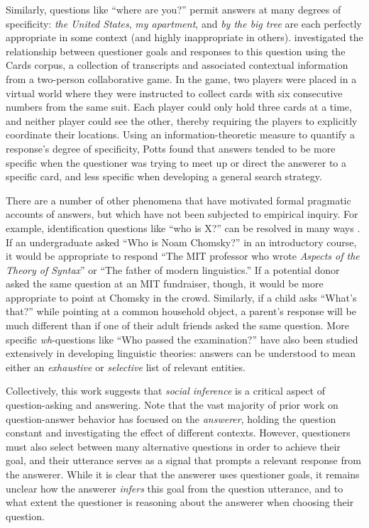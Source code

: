 \documentclass[12pt, floatsintext, jou]{apa6}
\begin{document}
Similarly, questions like ``where are you?'' permit answers at many degrees of specificity: \emph{the United States}, \emph{my apartment}, and \emph{by the big tree} are each perfectly appropriate in some context (and highly inappropriate in others).  investigated the relationship between questioner goals and responses to this question using the Cards corpus, a collection of transcripts and associated contextual information from a two-person collaborative game. In the game, two players were placed in a virtual world where they were instructed to collect cards with six consecutive numbers from the same suit. Each player could only hold three cards at a time, and neither player could see the other, thereby requiring the players to explicitly coordinate their locations. Using an information-theoretic measure to quantify a response's degree of specificity, Potts found that answers tended to be more specific when the questioner was trying to meet up or direct the answerer to a specific card, and less specific when developing a general search strategy. 

There are a number of other phenomena that have motivated formal pragmatic accounts of answers, but which have not been subjected to empirical inquiry. For example, identification questions like ``who is X?'' can be resolved in many ways  \cite{BoerLycan75_KnowingWho, Gerbrandy00_Identity, Aloni05_ConceptualCovers}. If an undergraduate asked ``Who is Noam Chomsky?'' in an introductory course, it would be appropriate to respond ``The MIT professor who wrote \emph{Aspects of the Theory of Syntax}'' or ``The father of modern linguistics.'' If a potential donor asked the same question at an MIT fundraiser, though, it would be more appropriate to point at Chomsky in the crowd. Similarly, if a child asks ``What's that?'' while pointing at a common household object, a parent's response will be much different than if one of their adult friends asked the same question. More specific \emph{wh}-questions like ``Who passed the examination?'' have also been studied extensively in developing linguistic theories: answers can be understood to mean either an \emph{exhaustive} or \emph{selective} list of relevant entities. 

Collectively, this work suggests that \emph{social inference} is a critical aspect of question-asking and answering. Note that the vast majority of prior work on question-answer behavior has focused on the \emph{answerer}, holding the question constant and investigating the effect of different contexts. 
However, questioners must also select between many alternative questions in order to achieve their goal, and their utterance serves as a signal that prompts a relevant response from the answerer. While it is clear that the answerer uses questioner goals, it remains unclear how the answerer \emph{infers} this goal from the question utterance, and to what extent the questioner is reasoning about the answerer when choosing their question. 
\end{document}
